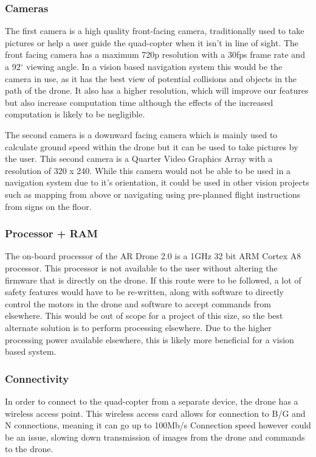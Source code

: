 \subsubsection{Cameras}
The first camera is a high quality front-facing camera, traditionally used to take pictures or help a user guide the quad-copter when it isn't in line of sight. The front facing camera has a maximum 720p resolution with a 30fps frame rate and a 92$^{\circ}$ viewing angle. In a vision based navigation system this would be the camera in use, as it has the best view of potential collisions and objects in the path of the drone. It also has a higher resolution, which will improve our features but also increase computation time although the effects of the increased computation is likely to be negligible.

The second camera is a downward facing camera which is mainly used to calculate ground speed within the drone but it can be used to take pictures by the user. This second camera is a Quarter Video Graphics Array with a resolution of 320 x 240.  While this camera would not be able to be used in a navigation system due to it's orientation, it could be used in other vision projects such as mapping from above or navigating using pre-planned flight instructions from signs on the floor.


\subsubsection{Processor + RAM}
The on-board processor of the AR Drone 2.0 is a 1GHz 32 bit ARM Cortex A8 processor. This processor is not available to the user without altering the firmware that is directly on the drone. If this route were to be followed, a lot of safety features would have to be re-written, along with software to directly control the motors in the drone and software to accept commands from elsewhere. This would be out of scope for a project of this size, so the best alternate solution is to perform processing elsewhere. Due to the higher processing power available elsewhere, this is likely more beneficial for a vision based system.


\subsubsection{Connectivity}
In order to connect to the quad-copter from a separate device, the drone has a wireless access point. This wireless access card allows for connection to B/G and N connections, meaning it can go up to 100Mb/s \cite{Nstandard} Connection speed however could be an issue, slowing down transmission of images from the drone and commands to the drone.

